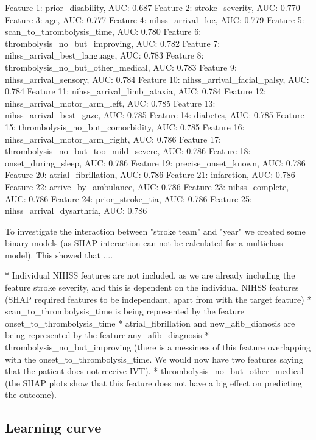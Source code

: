 Feature  1: prior\_disability, AUC: 0.687
Feature  2: stroke\_severity, AUC: 0.770
Feature  3: age, AUC: 0.777
Feature  4: nihss\_arrival\_loc, AUC: 0.779
Feature  5: scan\_to\_thrombolysis\_time, AUC: 0.780
Feature  6: thrombolysis\_no\_but\_improving, AUC: 0.782
Feature  7: nihss\_arrival\_best\_language, AUC: 0.783
Feature  8: thrombolysis\_no\_but\_other\_medical, AUC: 0.783
Feature  9: nihss\_arrival\_sensory, AUC: 0.784
Feature 10: nihss\_arrival\_facial\_palsy, AUC: 0.784
Feature 11: nihss\_arrival\_limb\_ataxia, AUC: 0.784
Feature 12: nihss\_arrival\_motor\_arm\_left, AUC: 0.785
Feature 13: nihss\_arrival\_best\_gaze, AUC: 0.785
Feature 14: diabetes, AUC: 0.785
Feature 15: thrombolysis\_no\_but\_comorbidity, AUC: 0.785
Feature 16: nihss\_arrival\_motor\_arm\_right, AUC: 0.786
Feature 17: thrombolysis\_no\_but\_too\_mild\_severe, AUC: 0.786
Feature 18: onset\_during\_sleep, AUC: 0.786
Feature 19: precise\_onset\_known, AUC: 0.786
Feature 20: atrial\_fibrillation, AUC: 0.786
Feature 21: infarction, AUC: 0.786
Feature 22: arrive\_by\_ambulance, AUC: 0.786
Feature 23: nihss\_complete, AUC: 0.786
Feature 24: prior\_stroke\_tia, AUC: 0.786
Feature 25: nihss\_arrival\_dysarthria, AUC: 0.786

To investigate the interaction between "stroke team" and "year" we created some binary models (as SHAP interaction can not be calculated for a multiclass model). This showed that ....

* Individual NIHSS features are not included, as we are already including the feature stroke severity, and this is dependent on the individual NIHSS features (SHAP required features to be independant, apart from with the target feature)
* scan\_to\_thrombolysis\_time is being represented by the feature onset\_to\_thrombolysis\_time
* atrial\_fibrillation and new\_afib\_dianosis are being represented by the feature any\_afib\_diagnosis
* thrombolysis\_no\_but\_improving (there is a messiness of this feature overlapping with the onset\_to\_thrombolysis\_time. We would now have two features saying that the patient does not receive IVT).
* thrombolysis\_no\_but\_other\_medical (the SHAP plots show that this feature does not have a big effect on predicting the outcome).

\iffalse
\subsection{Learning curve}


